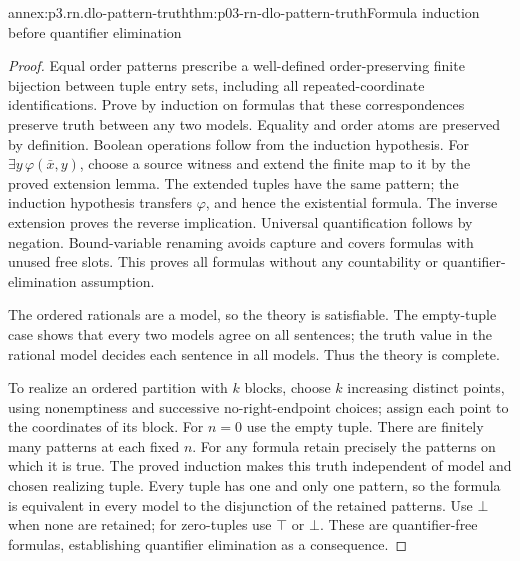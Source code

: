 \begin{annexitem}{annex:p3.rn.dlo-pattern-truth}{thm:p03-rn-dlo-pattern-truth}{Formula induction before quantifier elimination}
\begin{proof}
Equal order patterns prescribe a well-defined
order-preserving finite bijection between tuple entry
sets, including all repeated-coordinate identifications.
Prove by induction on formulas that these correspondences
preserve truth between any two models.
Equality and order atoms are preserved by definition.
Boolean operations follow from the induction hypothesis.
For \(\exists y\,\varphi(\bar x,y)\), choose a source
witness and extend the finite map to it by the proved
extension lemma. The extended tuples have the same
pattern; the induction hypothesis transfers \(\varphi\),
and hence the existential formula.
The inverse extension proves the reverse implication.
Universal quantification follows by negation.
Bound-variable renaming avoids capture and covers formulas
with unused free slots.
This proves all formulas without any countability or
quantifier-elimination assumption.

The ordered rationals are a model, so the theory is
satisfiable. The empty-tuple case shows that every two
models agree on all sentences; the truth value in the
rational model decides each sentence in all models.
Thus the theory is complete.

To realize an ordered partition with \(k\) blocks,
choose \(k\) increasing distinct points, using
nonemptiness and successive no-right-endpoint choices;
assign each point to the coordinates of its block.
For \(n=0\) use the empty tuple.
There are finitely many patterns at each fixed \(n\).
For any formula retain precisely the patterns on
which it is true. The proved induction makes this
truth independent of model and chosen realizing tuple.
Every tuple has one and only one pattern, so the
formula is equivalent in every model to the disjunction
of the retained patterns.
Use \(\bot\) when none are retained; for zero-tuples
use \(\top\) or \(\bot\).
These are quantifier-free formulas, establishing
quantifier elimination as a consequence.
\end{proof}
\end{annexitem}

